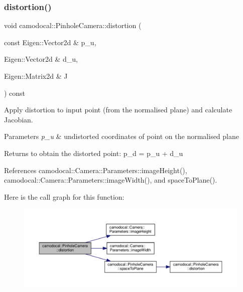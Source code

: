 \subsubsection{\texorpdfstring{distortion()}{distortion()}\hspace{0.1cm}{\footnotesize\ttfamily [2/2]}}
{\footnotesize\ttfamily void camodocal\+::\+Pinhole\+Camera\+::distortion (\begin{DoxyParamCaption}\item[{const Eigen\+::\+Vector2d \&}]{p\+\_\+u,  }\item[{Eigen\+::\+Vector2d \&}]{d\+\_\+u,  }\item[{Eigen\+::\+Matrix2d \&}]{J }\end{DoxyParamCaption}) const}



Apply distortion to input point (from the normalised plane) and calculate Jacobian. 


\begin{DoxyParams}{Parameters}
{\em p\+\_\+u} & undistorted coordinates of point on the normalised plane \\
\hline
\end{DoxyParams}
\begin{DoxyReturn}{Returns}
to obtain the distorted point\+: p\+\_\+d = p\+\_\+u + d\+\_\+u 
\end{DoxyReturn}


References camodocal\+::\+Camera\+::\+Parameters\+::image\+Height(), camodocal\+::\+Camera\+::\+Parameters\+::image\+Width(), and space\+To\+Plane().

Here is the call graph for this function\+:\nopagebreak
\begin{figure}[H]
\begin{center}
\leavevmode
\includegraphics[width=350pt]{classcamodocal_1_1PinholeCamera_a36fbf4d157d3dafd87dc52c8f664bcbc_cgraph}
\end{center}
\end{figure}
\mbox{\label{classcamodocal_1_1PinholeCamera_a8a557882a34c5269f6254df6e1d9bb4f}} 
